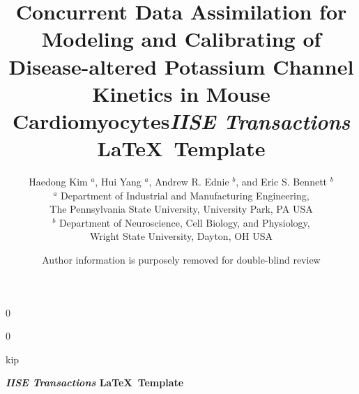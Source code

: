 \documentclass[11pt]{article}
\newcommand{\blind}{0}
\begin{document}
	
	\def\spacingset#1{\renewcommand{\baselinestretch}%
		{#1}\small\normalsize} \spacingset{1}
	
	\blind
	{
		\title{\bf Concurrent Data Assimilation for Modeling and Calibrating of Disease-altered Potassium Channel Kinetics in Mouse Cardiomyocytes}
		\author{Haedong Kim $^a$, Hui Yang $^a$, Andrew R. Ednie $^b$, and Eric S. Bennett $^b$ \\
		$^a$ Department of Industrial and Manufacturing Engineering, \\
		The Pennsylvania State University, University Park, PA USA \\
        $^b$ Department of Neuroscience, Cell Biology, and Physiology, \\
        Wright State University, Dayton, OH USA}
		\date{}
		\maketitle
	} \fi
	
	\blind
	{
        \title{\bf \emph{IISE Transactions} \LaTeX \ Template}
		\author{Author information is purposely removed for double-blind review}
		
\bigskip
		\bigskip
		\bigs   kip
		\begin{center}
			{\LARGE\bf \emph{IISE Transactions} \LaTeX \ Template}
		\end{center}
		\medskip
	} \fi
	\bigskip
	
\end{document}
